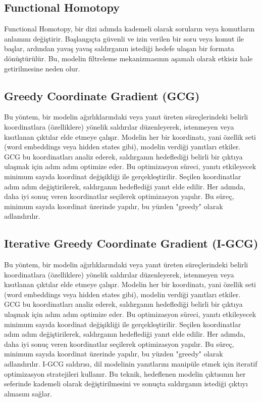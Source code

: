 \newpage

\subsection{Functional Homotopy}

Functional Homotopy, bir dizi adımda kademeli olarak soruların veya komutların anlamını değiştirir. Başlangıçta güvenli ve izin verilen bir soru veya komut ile başlar, ardından yavaş yavaş saldırganın istediği hedefe ulaşan bir formata dönüştürülür. Bu, modelin filtreleme mekanizmasının aşamalı olarak etkisiz hale getirilmesine neden olur.

\newpage

\subsection{Greedy Coordinate Gradient (GCG)}

Bu yöntem, bir modelin ağırlıklarındaki veya yanıt üreten süreçlerindeki belirli koordinatlara (özelliklere) yönelik saldırılar düzenleyerek, istenmeyen veya kısıtlanan çıktılar elde etmeye çalışır. Modelin her bir koordinatı, yani özellik seti (word embeddings veya hidden states gibi), modelin verdiği yanıtları etkiler. GCG bu koordinatları analiz ederek, saldırganın hedeflediği belirli bir çıktıya ulaşmak için adım adım optimize eder. Bu optimizasyon süreci, yanıtı etkileyecek minimum sayıda koordinat değişikliği ile gerçekleştirilir. Seçilen koordinatlar adım adım değiştirilerek, saldırganın hedeflediği yanıt elde edilir. Her adımda, daha iyi sonuç veren koordinatlar seçilerek optimizasyon yapılır. Bu süreç, minimum sayıda koordinat üzerinde yapılır, bu yüzden "greedy" olarak adlandırılır.

\newpage

\subsection{Iterative Greedy Coordinate Gradient (I-GCG)}

Bu yöntem, bir modelin ağırlıklarındaki veya yanıt üreten süreçlerindeki belirli koordinatlara (özelliklere) yönelik saldırılar düzenleyerek, istenmeyen veya kısıtlanan çıktılar elde etmeye çalışır. Modelin her bir koordinatı, yani özellik seti (word embeddings veya hidden states gibi), modelin verdiği yanıtları etkiler. GCG bu koordinatları analiz ederek, saldırganın hedeflediği belirli bir çıktıya ulaşmak için adım adım optimize eder. Bu optimizasyon süreci, yanıtı etkileyecek minimum sayıda koordinat değişikliği ile gerçekleştirilir. Seçilen koordinatlar adım adım değiştirilerek, saldırganın hedeflediği yanıt elde edilir. Her adımda, daha iyi sonuç veren koordinatlar seçilerek optimizasyon yapılır. Bu süreç, minimum sayıda koordinat üzerinde yapılır, bu yüzden "greedy" olarak adlandırılır. I-GCG saldırısı, dil modelinin yanıtlarını manipüle etmek için iteratif optimizasyon stratejileri kullanır. Bu teknik, hedeflenen modelin çıktısının her seferinde kademeli olarak değiştirilmesini ve sonuçta saldırganın istediği çıktıyı almasını sağlar.

